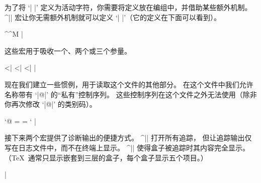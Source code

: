 为了将 `|^^M|' 定义为活动字符，你需要将定义放在编组中，并借助某些额外机制。
\pix^|| 宏让你无需额外机制就可以定义 `|^^M|'（它的定义在下面可以看到）。

\csdisplay
{\makeactive\^^M \long\gdef\letreturn#1{\let^^M = #1}}%
|

这些宏用于吸收一个、两个或三个参量。

\pix^^|\gobble|
\pix^^|\gobbletwo|
\pix^^|\gobblethree|
\csdisplay
\def\gobble#1{}\def\gobbletwo#1#2{}%
\def\gobblethree#1#2#3{}%
|

现在我们建立一些惯例，用于读取这个文件的其他部分。
在这个文件中我们允许名称带有 `|@|' 的``私有''控制序列。
这些控制序列在这个文件之外无法使用（除非你再次修改 `|@|' 的类别码）。

\csdisplay
\catcode`@ =     %
\let\@plainwlog = \wlog %
\let\wlog = \gobble
\newlinechar = `^^J
|

接下来两个宏提供了诊断输出的便捷方式。
\pix^|\loggingall| 打开所有追踪，
但让追踪输出仅写在日志文件中，而不在终端上显示。
\pix^|\tracingboxes| 使得盒子被追踪时其内容完全显示。%
（\TeX\ 通常只显示嵌套到三层的盒子，每个盒子显示五个项目。）

\csdisplay
\def\loggingall{\tracingcommands\tw@\tracingstats\tw@
   \tracingpages\@ne\tracingoutput\@ne
   \tracinglostchars\@ne\tracingmacros\tw@
   \tracingparagraphs\@ne\tracingrestores\@ne
   \showboxbreadth\maxdimen\showboxdepth\maxdimen}%
\def\tracingboxes{\showboxbreadth = \maxdimen
   \showboxdepth = \maxdimen}%
|

